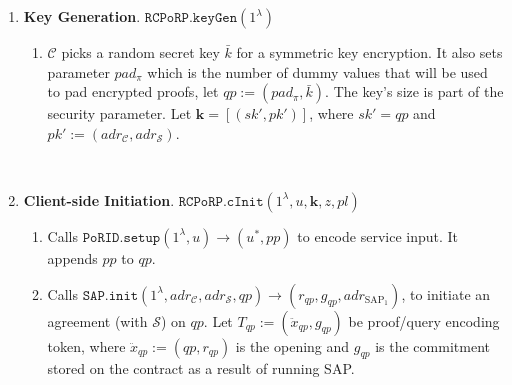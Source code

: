 \begin{enumerate}
\item \textbf{Key Generation}. $\mathtt{RCPoRP}.\mathtt{keyGen}(1^{\scriptscriptstyle\lambda})$
\begin{enumerate}

\item  $\mathcal C$  picks a random secret key  $\bar{k}$ for a symmetric key encryption. It also sets  parameter $pad_{\scriptscriptstyle \pi}$ which is the number of  dummy values that will be used to pad encrypted proofs,  let $qp:=(pad_{\scriptscriptstyle \pi}, \bar{k})$. The key's size is part of the security parameter. Let  $\bm{k}=[(sk',pk')]$, where  $sk'=qp$ and $pk':=(adr_{\scriptscriptstyle\mathcal{C}},adr_{\scriptscriptstyle\mathcal{S}})$. 






\end{enumerate}

\

\item \textbf{Client-side Initiation}. $\mathtt{RCPoRP}.\mathtt{cInit}(1^\lambda, u,\bm{k}, z,pl)$
\begin{enumerate}

\item Calls $\mathtt{PoRID.setup}(1^{\lambda}, u)\rightarrow (u^{\scriptscriptstyle *},pp)$ to encode service input. It appends $pp$ to $qp$.


\item  Calls $\mathtt{SAP.init}(1^{\scriptscriptstyle\lambda}, adr_{\scriptscriptstyle\mathcal{C}}, adr_{\scriptscriptstyle\mathcal{S}},qp )\rightarrow(r_{\scriptscriptstyle qp}, g_{\scriptscriptstyle qp}, adr_{\scriptscriptstyle\text{SAP}_{\scriptscriptstyle 1}})$, to initiate an agreement (with $\mathcal{S}$) on $qp$.  Let $T_{\scriptscriptstyle qp}:=(\ddot{x}_{\scriptscriptstyle qp}, g_{\scriptscriptstyle qp})$ be proof/query encoding token,  where  $\ddot{x}_{\scriptscriptstyle qp}:=(qp,r_{\scriptscriptstyle qp})$ is the opening and $g_{\scriptscriptstyle qp}$ is the commitment stored on the contract as a result of running   SAP. 



\end{enumerate}
\end{enumerate}
